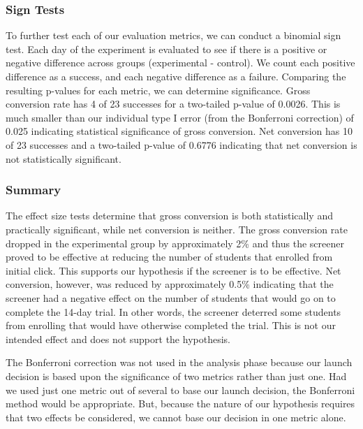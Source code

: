 \documentclass[paper=a4, fontsize=11pt]{scrartcl} %
\numberwithin{equation}{section} %
\numberwithin{figure}{section} %
\numberwithin{table}{section} %
\begin{document}

\subsubsection{Sign Tests}

To further test each of our evaluation metrics, we can conduct a binomial sign test.  Each day of the experiment is evaluated to see if there is a positive or negative difference across groups (experimental - control).  We count each positive difference as a success, and each negative difference as a failure.  Comparing the resulting p-values for each metric, we can determine significance.
Gross conversion rate has 4 of 23 successes for a two-tailed p-value of 0.0026.  This is much smaller than our individual type I error (from the Bonferroni correction) of 0.025 indicating statistical significance of gross conversion.  Net conversion has 10 of 23 successes and a two-tailed p-value of 0.6776 indicating that net conversion is not statistically significant.


\subsubsection{Summary}

The effect size tests determine that gross conversion is both statistically and practically significant, while net conversion is neither.   The gross conversion rate dropped in the experimental group by approximately 2\% and thus the screener proved to be effective at reducing the number of students that enrolled from initial click.  This supports our hypothesis if the screener is to be effective.  Net conversion, however, was reduced by approximately 0.5\% indicating that the screener had a negative effect on the number of students that would go on to complete the 14-day trial.  In other words, the screener deterred some students from enrolling that would have otherwise completed the trial.  This is not our intended effect and does not support the hypothesis.  \newline

The Bonferroni correction was not used in the analysis phase because our launch decision is based upon the significance of two metrics rather than just one.  Had we used just one metric out of several to base our launch decision, the Bonferroni method would be appropriate.  But, because the nature of our hypothesis requires that two effects be considered, we cannot base our decision in one metric alone. \newline
\end{document}
